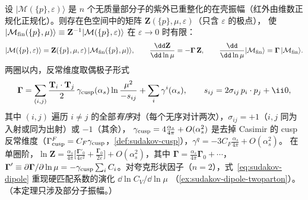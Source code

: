 \begin{theorem}\label{thm:sudakov-ir-poles}
设 $|\mathcal M(\{p\},\varepsilon)\rangle$ 是 $n$ 个无质量部分子的紫外已重整化的在壳振幅（红外由维数正规化正规化）。则存在色空间中的矩阵 $\mathbf Z(\{p\},\mu,\varepsilon)$（只含 $\varepsilon$ 的极点），
使 $|\mathcal M_{\rm fin}(\{p\},\mu)\rangle\equiv\mathbf Z^{-1}|\mathcal M(\{p\},\varepsilon)\rangle$ 在 $\varepsilon\to0$ 时有限：
\begin{equation}\label{eq:sudakov-Zfact}
|\mathcal M(\{p\},\varepsilon)\rangle=\mathbf Z(\{p\},\mu,\varepsilon)\,|\mathcal M_{\rm fin}(\{p\},\mu)\rangle,\qquad
\frac{\dd\mathbf Z}{\dd\ln\mu}=-\boldsymbol\Gamma\,\mathbf Z,\qquad \frac{\dd}{\dd\ln\mu}|\mathcal M_{\rm fin}\rangle=\boldsymbol\Gamma\,|\mathcal M_{\rm fin}\rangle .
\end{equation}
两圈以内，反常维度取偶极子形式
\begin{equation}\label{eq:sudakov-dipole}
\boldsymbol\Gamma=\sum_{(i,j)}\frac{\mathbf T_i\cdot\mathbf T_j}{2}\,\gamma_{\rm cusp}(\alpha_s)\ln\frac{\mu^2}{-s_{ij}}+\sum_i\gamma^i(\alpha_s),\qquad s_{ij}=2\sigma_{ij}\,p_i\cdot p_j+\ii0,
\end{equation}
其中 $(i,j)$ 遍历 $i\ne j$ 的全部\emph{有序}对（每个无序对计两次），$\sigma_{ij}=+1$（$i,j$ 同为入射或同为出射）或 $-1$（其余），
$\gamma_{\rm cusp}=4\frac{\alpha_s}{4\pi}+O(\alpha_s^2)$ 是去掉 Casimir 的 cusp 反常维度（$\Gamma^F_{\rm cusp}=C_F\gamma_{\rm cusp}$，\cref{def:sudakov-cusp}），$\gamma^q=-3C_F\frac{\alpha_s}{4\pi}+O(\alpha_s^2)$。
在单圈阶，$\ln\mathbf Z=\frac{\alpha_s}{4\pi}\big[\frac{\boldsymbol\Gamma'_0}{4\varepsilon^2}+\frac{\boldsymbol\Gamma_0}{2\varepsilon}\big]+O(\alpha_s^2)$，其中 $\boldsymbol\Gamma=\frac{\alpha_s}{4\pi}\boldsymbol\Gamma_0+\cdots$，
$\boldsymbol\Gamma'\equiv\partial\boldsymbol\Gamma/\partial\ln\mu=-\gamma_{\rm cusp}\sum_iC_i$。对夸克形状因子（$n=2$），式~\eqref{eq:sudakov-dipole} 重现硬匹配系数的演化 $\dd\ln C_V/\dd\ln\mu$
（\cref{ex:sudakov-dipole-twoparton}）。（本定理只涉及部分子振幅。）
\end{theorem}

